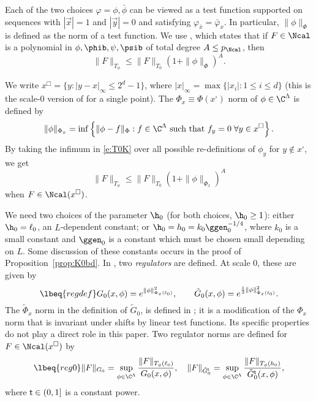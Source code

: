 Each of the two choices $\varphi = \phi, \bar\phi$
can be viewed as a test function supported on sequences with
$|\vec x| = 1$ and $|\vec y| = 0$
and satisfying $\varphi_{\bar x} = \bar\varphi_x$.
In particular, $\|\phi\|_\Phi$ is defined as the norm of a test function.
We use \cite[Proposition~\ref{norm-prop:T0K}]{BS-rg-norm},
which states that if $F \in \Ncal$ is a polynomial in $\phi,\phib,\psi,\psib$ of
total degree $A \leq p_\Ncal$, then
\begin{equation}
\label{e:T0K}
\|F\|_{T_\phi} \leq \|F\|_{T_0} (1 + \|\phi\|_\Phi)^A.
\end{equation}

We write $x^\Box = \{y: |y-x|_\infty \le 2^d-1\}$,
where $|x|_\infty = \max\{|x_i| : 1 \le i \le d\}$
(this is the scale-0 version
of \cite[\eqref{IE-e:ssn}]{BS-rg-IE} for a single point).
The $\Phi_x \equiv \Phi(x^\square)$ norm of $\phi \in \C^\Lambda$ is defined by
\begin{equation}
\|\phi\|_{\Phi_x}
  =
\inf
\left\{
  \|\phi - f\|_\Phi : f \in \C^\Lambda \text{ such that } f_y = 0 \;\forall y \in x^\square
\right\}
.
\end{equation}
By taking the infimum in \eqref{e:T0K} over all possible
re-definitions of $\phi_y$ for $y \notin x^\square$, we get
\begin{equation}
\label{e:T0Kx}
\|F\|_{T_\phi}
  \leq
\|F\|_{T_0} (1 + \|\phi\|_{\Phi_x})^A
\end{equation}
when $F \in \Ncal(x^\square)$.

We need two choices of the parameter $\h_0$ (for both choices, $\h_0 \ge 1$):
either $\h_0 = \ell_0$, an $L$-dependent constant;
or $\h_0 = h_0 = k_0 \ggen_0^{-1/4}$, where $k_0$ is a small constant and
$\ggen_0$ is a constant which must be chosen small depending on $L$.
Some discussion of these constants occurs in the
proof of Proposition~\ref{prop:K0bd}.
In \cite{BS-rg-IE}, two \emph{regulators} are defined.
At scale $0$, these are given by
\begin{equation}
\lbeq{regdef}
G_0(x, \phi)
  = e^{\|\phi\|^2_{\Phi_x(\ell_0)}},
  \qquad
\tilde G_0(x, \phi)
  =
e^{\frac{1}{2} \|\phi\|^2_{\tilde\Phi_x(\ell_0)}}.
\end{equation}
The $\tilde \Phi_x$ norm in the definition of $\tilde G_0$,
is defined in \cite[\eqref{IE-e:Phitilnorm}]{BS-rg-IE};
it is a modification of the $\Phi_x$ norm that is invariant under shifts by
linear test functions.  Its specific properties do not play a direct role  in this paper.
Two regulator norms are defined for $F \in \Ncal(x^\square)$ by
\begin{equation}
\lbeq{reg0}
    \|F\|_{G_0} = \sup_{\phi\in\C^\Lambda} \frac{\|F\|_{T_\phi(\ell_0)}}{G_0(x,\phi)}
    , \quad
    \|F\|_{\tilde{G}^{\sf t}_0} = \sup_{\phi\in\C^\Lambda} \frac{\|F\|_{T_\phi(h_0)}}{\tilde{G}^{\sf t}_0(x,\phi)}
    ,
\end{equation}
where ${\sf t} \in (0, 1]$ is a constant power.

